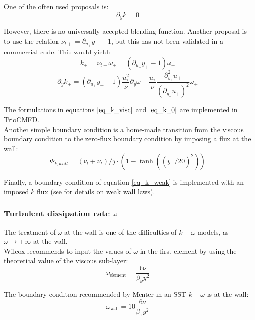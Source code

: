 One of the often used proposals is:
\begin{equation}\label{eq_k_0}
	\partial_y k =0
\end{equation}

However, there is no universally accepted blending function. Another proposal is to use the relation $\nu_{t+} = \partial_{u_+}y_+ - 1$, but this has not been validated in a commercial code. This would yield:
\begin{equation}
	k_+ = \nu_{t+}\omega_+ = (\partial_{u_+}y_+ - 1) \omega_+
\end{equation}
\begin{equation}\label{eq_k_weak}
	\partial_y k_+ = (\partial_{u_+}y_+ - 1) \frac{u_\tau^2}{\nu} \partial_y \omega 
	- \frac{u_\tau}{\nu}\frac{\partial_{y_+}^2 u_+}{(\partial_{y_+}u_+)^2} \omega_+
\end{equation}

The formulations in equations $\eqref{eq_k_visc}$ and $\eqref{eq_k_0}$ are implemented in TrioCMFD. \\

Another simple boundary condition is a home-made transition from the viscous boundary condition to the zero-flux boundary condition by imposing a flux at the wall:
\begin{equation}\label{eq_k_blending}
	\Phi_{k, wall} = (\nu_l + \nu_t)/y \cdot (1-\tanh((y_+/20)^2))
\end{equation}

Finally, a boundary condition of equation \ref{eq_k_weak} is implemented with an imposed $k$ flux (see \cite{Mierka2007} for details on weak wall laws).

\subsubsection{Turbulent dissipation rate $\omega$}

The treatment of $\omega$ at the wall is one of the difficulties of $k-\omega$ models, as $\omega\rightarrow+\infty$ at the wall. \\

Wilcox recommends to input the values of $\omega$ in the first element by using the theoretical value of the viscous sub-layer: 
\begin{equation}
	\omega_\text{element} = \frac{6\nu}{\beta_\omega y^2}
\end{equation}

The boundary condition recommended by Menter in an SST $k-\omega$ \cite{Menter1993} is at the wall: 
\begin{equation}
	\omega_\text{wall} = 10 \frac{6\nu}{\beta_\omega y^2}
\end{equation}


